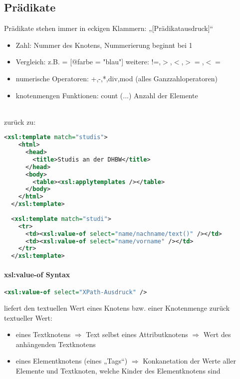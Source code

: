 \subsection{Prädikate}
Prädikate stehen immer in eckigen Klammern: „[Prädikatausdruck]“\\
\begin{itemize}
\item Zahl: Nummer des Knotens, Nummerierung beginnt bei 1
\item Vergleich: z.B. = [@farbe = "blau"] weitere: !=,$>$,$<$,$>=$,$<=$
\item numerische Operatoren: +,-,*,div,mod (alles Ganzzahloperatoren)
\item knotenmengen Funktionen: count (...) Anzahl der Elemente
\end{itemize}
\hspace{0,3cm}\\
zurück zu:
\begin{lstlisting}[caption={Praktisches Beispiel für xsl:template}, label={lst:template}, language={XML}]
  <xsl:template match="studis">
    <html>
      <head>
        <title>Studis an der DHBW</title>
      </head>
      <body>
        <table><xsl:applytemplates /></table>
      </body>
    </html>
  </xsl:template>
  
  <xsl:template match="studi">
    <tr>
      <td><xsl:value-of select="name/nachname/text()" /></td>
      <td><xsl:value-of select="name/vorname" /></td>
    </tr>
  </xsl:template>
\end{lstlisting}

\paragraph{xsl:value-of Syntax}\hspace{1mm}
\begin{lstlisting}[caption={xsl:value-of Syntax}, label={lst:value-of}, language={XML}]
<xsl:value-of select="XPath-Ausdruck" />
\end{lstlisting}
liefert den textuellen Wert eines Knotens bzw. einer Knotenmenge zurück
textueller Wert:
\begin{itemize}
\item eines Textknotens $\Rightarrow$ Text selbst eines Attributknotens $\Rightarrow$ Wert des anhängenden Textknotens
\item eines Elementknotens (eines „Tags“) $\Rightarrow$ Konkanetation der Werte aller Elemente und Textknoten, welche Kinder des Elementknotens sind
\end{itemize}

